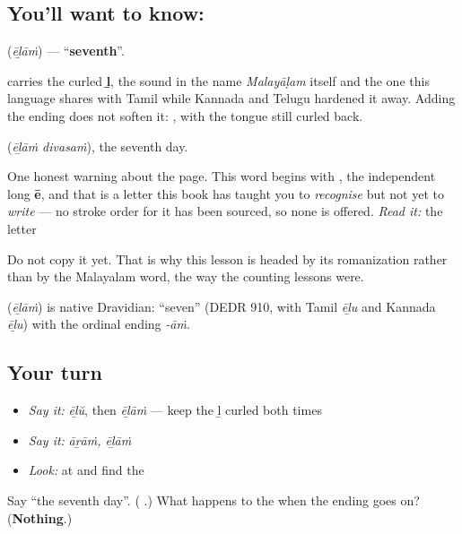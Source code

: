 \subsection*{You'll want to know: }
\textbf{} (\emph{ēḻāṁ}) — \textquotedblleft{}\textbf{seventh}\textquotedblright{}.

\textbf{} carries the curled \textbf{ḻ}, the sound in the name \emph{Malayāḷam} itself and the one this language shares with Tamil while Kannada and Telugu hardened it away. Adding the ending does not soften it: \textbf{}, with the tongue still curled back.

\textbf{ } (\emph{ēḻāṁ divasaṁ}), the seventh day.

One honest warning about the page. This word begins with \textbf{}, the independent long \textbf{ē}, and that is a letter this book has taught you to \emph{recognise} but not yet to \emph{write} — no stroke order for it has been sourced, so none is offered. \emph{Read it:} the letter

Do not copy it yet. That is why this lesson is headed by its romanization rather than by the Malayalam word, the way the counting lessons were.

\begin{cousinweb}
\textbf{} (\emph{ēḻāṁ}) is native Dravidian: \textquotedblleft{}seven\textquotedblright{} (DEDR 910, with Tamil \emph{ēḻu} and Kannada \emph{ēḻu}) with the ordinal ending \emph{-āṁ}.
\end{cousinweb}

\subsection*{Your turn}
\begin{itemize}
\raggedright
  \item \emph{Say it:} \emph{ēḻŭ}, then \emph{ēḻāṁ} — keep the ḻ curled both times
  \item \emph{Say it:} \emph{āṟāṁ, ēḻāṁ}
  \item \emph{Look:} at  and find the 
\end{itemize}

\begin{tcolorbox}[breakable,colback=teal!4,colframe=teal!35!black,title={Before you move on}]
Say \textquotedblleft{}the seventh day\textquotedblright{}. (\textbf{ }.) What happens to the  when the ending goes on? (\textbf{Nothing}.)
\end{tcolorbox}
